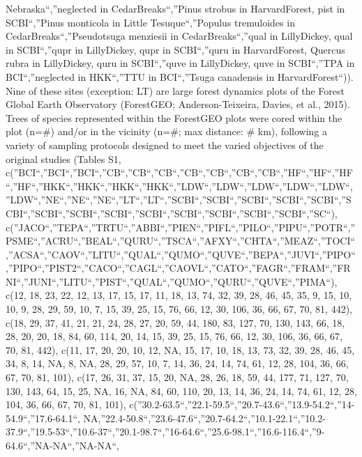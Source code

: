 \documentclass[
]{article}
\begin{document}
Nebraska``,''neglected in CedarBreaks``,''Pinus strobus in
HarvardForest, pist in SCBI``,''Pinus monticola in Little
Tesuque``,''Populus tremuloides in CedarBreaks``,''Pseudotsuga menziesii
in CedarBreaks``,''qual in LillyDickey, qual in SCBI``,''qupr in
LillyDickey, qupr in SCBI``,''quru in HarvardForest, Quercus rubra in
LillyDickey, quru in SCBI``,''quve in LillyDickey, quve in SCBI``,''TPA
in BCI``,''neglected in HKK``,''TTU in BCI``,''Tsuga canadensis in
HarvardForest``)). Nine of these sites (exception: LT) are large forest
dynamics plots of the Forest Global Earth Observatory (ForestGEO;
Anderson-Teixeira, Davies, et al., 2015). Trees of species represented
within the ForestGEO plots were cored within the plot (n=\#) and/or in
the vicinity (n=\#; max distance: \# km), following a variety of
sampling protocols designed to meet the varied objectives of the
original studies (Tables S1,
c(''BCI``,''BCI``,''BCI``,''CB``,''CB``,''CB``,''CB``,''CB``,''CB``,''CB``,''HF``,''HF``,''HF``,''HF``,''HKK``,''HKK``,''HKK``,''HKK``,''LDW``,''LDW``,''LDW``,''LDW``,''LDW``,''LDW``,''NE``,''NE``,''NE``,''LT``,''LT``,''SCBI``,''SCBI``,''SCBI``,''SCBI``,''SCBI``,''SCBI``,''SCBI``,''SCBI``,''SCBI``,''SCBI``,''SCBI``,''SCBI``,''SCBI``,''SCBI``,''SC``),
c(''JACO``,''TEPA``,''TRTU``,''ABBI``,''PIEN``,''PIFL``,''PILO``,''PIPU``,''POTR``,''PSME``,''ACRU``,''BEAL``,''QURU``,''TSCA``,''AFXY``,''CHTA``,''MEAZ``,''TOCI``,''ACSA``,''CAOV``,''LITU``,''QUAL``,''QUMO``,''QUVE``,''BEPA``,''JUVI``,''PIPO``,''PIPO``,''PIST2``,''CACO``,''CAGL``,''CAOVL``,''CATO``,''FAGR``,''FRAM``,''FRNI``,''JUNI``,''LITU``,''PIST``,''QUAL``,''QUMO``,''QURU``,''QUVE``,''PIMA``),
c(12, 18, 23, 22, 12, 13, 17, 15, 17, 11, 18, 13, 74, 32, 39, 28, 46,
45, 35, 9, 15, 10, 10, 9, 28, 29, 59, 10, 7, 15, 39, 25, 15, 76, 66, 12,
30, 106, 36, 66, 67, 70, 81, 442), c(18, 29, 37, 41, 21, 21, 24, 28, 27,
20, 59, 44, 180, 83, 127, 70, 130, 143, 66, 18, 28, 20, 20, 18, 84, 60,
114, 20, 14, 15, 39, 25, 15, 76, 66, 12, 30, 106, 36, 66, 67, 70, 81,
442), c(11, 17, 20, 20, 10, 12, NA, 15, 17, 10, 18, 13, 73, 32, 39, 28,
46, 45, 34, 8, 14, NA, 8, NA, 28, 29, 57, 10, 7, 14, 36, 24, 14, 74, 61,
12, 28, 104, 36, 66, 67, 70, 81, 101), c(17, 26, 31, 37, 15, 20, NA, 28,
26, 18, 59, 44, 177, 71, 127, 70, 130, 143, 64, 15, 25, NA, 16, NA, 84,
60, 110, 20, 13, 14, 36, 24, 14, 74, 61, 12, 28, 104, 36, 66, 67, 70,
81, 101),
c(''30.2-63.5``,''22.1-59.5``,''20.7-43.6``,''13.9-54.2``,''14-54.9``,''17.6-64.1``,
NA,''22.4-50.8``,''23.6-47.6``,''20.7-64.2``,''10.1-22.1``,''10.2-37.9``,''19.5-53``,''10.6-37``,''20.1-98.7``,''16-64.6``,''25.6-98.1``,''16.6-116.4``,''9-64.6``,''NA-NA``,''NA-NA``,
\end{document}
